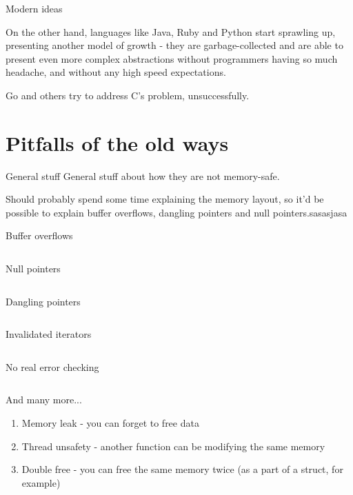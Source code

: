 \documentclass[usenames,dvipsnames,10pt,aspectratio=169]{beamer}
\begin{document}
\begin{frame}{Modern ideas}

On the other hand, languages like Java, 
Ruby and Python start sprawling up, 
presenting another model of growth - 
they are garbage-collected and are able 
to present even more complex abstractions 
without programmers having so much headache, 
and without any high speed expectations.

Go and others try to address C’s problem, unsuccessfully.

\end{frame}


\section{Pitfalls of the old ways}

\begin{frame}{General stuff} 
	General stuff about how they are not memory-safe.
	

	Should probably spend some time explaining the memory layout,
	so it'd be possible to explain buffer overflows, dangling 
	pointers and null pointers.sasasjasa
\end{frame}

\begin{frame}{Buffer overflows} 
	\inputminted[fontsize=\large]{c}{code/overflow.c}
\end{frame}

\begin{frame}{Null pointers}
	\inputminted[fontsize=\large]{c}{code/nullp.c}
\end{frame}

\begin{frame}{Dangling pointers} 
	\inputminted[fontsize=\large]{c}{code/danp.c}
\end{frame}

\begin{frame}{Invalidated iterators} 
	\inputminted[fontsize=\large]{c}{code/iter.c}
\end{frame}

\begin{frame}{No real error checking} 
	\inputminted[fontsize=\large]{c}{code/errorcheck.c}
\end{frame}

\begin{frame}{And many more...}
	\begin{enumerate}
		\item Memory leak - you can forget to free data
		\item Thread unsafety - another function can be modifying the same memory
		\item Double free - you can free the same memory twice (as a part of a struct, for example)
	\end{enumerate}
\end{frame}
\end{document}
